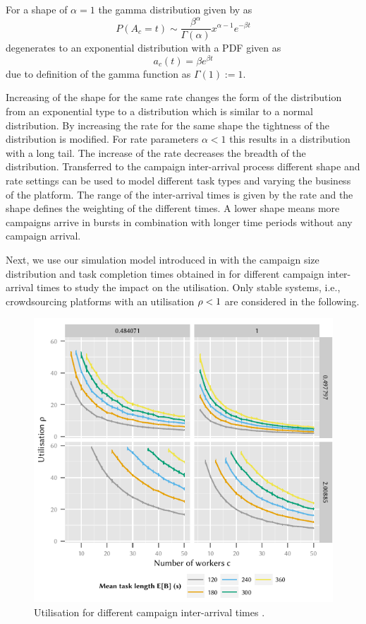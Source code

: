 For a shape of \(\alpha = 1\) the gamma distribution given by as
\[
P(A_c=t) \sim \frac{\beta^\alpha}{\Gamma(\alpha)} x^{\alpha-1} e^{-{\beta}t}
\]
degenerates to an exponential distribution with a \gls{PDF} given as 
 \[
a_c(t) = \beta e^{\beta t}
 \]
due to definition of the gamma function as \(\Gamma(1) := 1\).

Increasing of the shape for the same rate changes the form of the distribution from an exponential type to a distribution which is similar to a normal distribution.
By increasing the rate for the same shape the tightness of the distribution is modified.
For rate parameters \(\alpha < 1\) this results in a distribution with a long tail.
The increase of the rate decreases the breadth of the distribution.
Transferred to the campaign inter-arrival process \campaignIAT different shape and rate settings can be used to model different task types and varying the business of the platform.
The range of the inter-arrival times is given by the rate and the shape defines the weighting of the different times.
A lower shape means more campaigns arrive in bursts in combination with longer time periods without any campaign arrival.

Next, we use our simulation model introduced in  with the campaign size distribution \campaignSize and task completion times \taskDuration obtained in  for different campaign inter-arrival times to study the impact on the utilisation. 
Only stable systems, i.e., crowdsourcing platforms with an utilisation \(\rho < 1\) are considered in the following.

\begin{figure}
	\centering
	\includegraphics{cloud/crowdsourcing/numerical_evaluation/figures/parameter_utilization}
	\caption{Utilisation \workerUtilization for different campaign inter-arrival times \campaignIAT.}
	\label{fig:cloud:crowdsourcing:performance_evaluation:distributions:parameter_utilization}
\end{figure}

